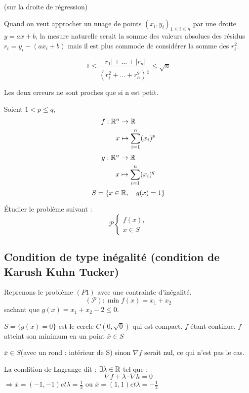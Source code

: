 
\begin{remarque} (sur la droite de régression)

	Quand on veut approcher un nuage de points $(x_i, y_i)_{1 \leq i \leq n}$ par une droite $y = ax +b$, la mesure naturelle serait la somme des valeurs absolues des résidus $r_i = y_i -(ax_i+b)$ mais il est plus commode de considérer la somme des $r_i^2$.

	\[ 1 \leq \frac{ |r_1| + \dots + |r_n| }{ (r_i^2 + \dots + r_n^2)^{\frac{1}{2}} } \leq \sqrt{n} \]
	
	Les deux erreurs ne sont proches que si n est petit.
\end{remarque}

\begin{exemple}
	Soient $1 < p \leq q$,
	\begin{align*}
	f : \mathbb{R}^n & \rightarrow  \mathbb{R} \\
	x & \mapsto \sum_{i=1}^n (x_i)^p
	\end{align*}
	\begin{align*}
	g : \mathbb{R}^n & \rightarrow  \mathbb{R} \\
	x & \mapsto \sum_{i=1}^n (x_i)^q
	\end{align*}
	\[ S = \{ x \in \mathbb{R}, \quad g(x) = 1 \} \]
	
	Étudier le problème suivant :
	\[ \mathcal{P} \begin{cases} f(x), \\ x \in S \end{cases} \]
	
	
\end{exemple}

\subsection{Condition de type inégalité (condition de Karush Kuhn Tucker)}

\begin{exemple}
	Reprenons le problème $(P1)$ avec une contrainte d'inégalité.
	\[ (\mathcal{P}) : \min f(x) = x_1 + x_2 \]
	sachant que $g(x) = x_1+x_2 -2 \leq 0$.
	
	$S = \{ g(x) = 0 \}$ est le cercle $C(0, \sqrt{0})$ qui est compact. $f$ étant continue, $f$ atteint son minimum en un point $\bar{x} \in S$
	
	$\bar{x} \in S$(avec un rond : intérieur de S) sinon $\nabla f$ serait nul, ce qui n'est pas le cas.
	
	La condition de Lagrange dit : $\exists \lambda \in \mathbb{R}$ tel que : \[ \nabla f + \lambda \cdot \nabla h = 0 \]
	$\Rightarrow \bar{x} = (-1, -1) et \lambda = \frac{1}{2}$ ou $\bar{x} = (1, 1) et \lambda = -\frac{1}{2}$
	
\end{exemple}
	
